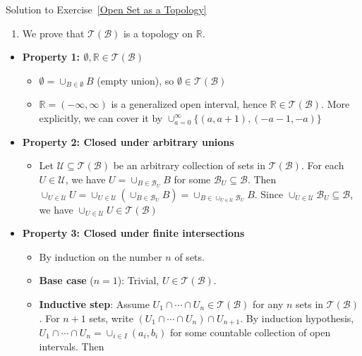 \begin{mystsolution}{Solution to Exercise~\ref{Open Set as a Topology}}\begin{enumerate}
\item We prove that $\mathcal{T}(\mathcal{B})$ is a topology on $\mathbb{R}$.
\end{enumerate}

\begin{itemize}
\item \textbf{Property 1: $\emptyset, \mathbb{R} \in \mathcal{T}(\mathcal{B})$}

\begin{itemize}
\item $\emptyset = \cup_{B \in \emptyset} B$ (empty union), so $\emptyset \in \mathcal{T}(\mathcal{B})$
\item $\mathbb{R} = ( -\infty, \infty)$ is a generalized open interval, hence $\mathbb{R} \in \mathcal{T}(\mathcal{B})$. More explicitly, we can cover it by $\cup_{a=0}^{\infty} \{(a,a+1),( -a -1, -a)\}$
\end{itemize}


\item \textbf{Property 2: Closed under arbitrary unions}

\begin{itemize}
\item Let $\mathcal{U} \subseteq \mathcal{T}(\mathcal{B})$ be an arbitrary collection of sets in $\mathcal{T}(\mathcal{B})$. For each $U \in \mathcal{U}$, we have $U = \cup_{B \in \mathcal{B}_U} B$ for some $\mathcal{B}_U \subseteq \mathcal{B}$. Then $\cup_{U \in \mathcal{U}} U = \cup_{U \in \mathcal{U}} \left(\cup_{B \in \mathcal{B}_U} B\right) = \cup_{B \in \cup_{U \in \mathcal{U}} \mathcal{B}_U} B$. Since $\cup_{U \in \mathcal{U}} \mathcal{B}_U \subseteq \mathcal{B}$, we have $\cup_{U \in \mathcal{U}} U \in \mathcal{T}(\mathcal{B})$
\end{itemize}


\item \textbf{Property 3: Closed under finite intersections}

\begin{itemize}
\item By induction on the number $n$ of sets.
\item \textbf{Base case} ($n=1$): Trivial, $U \in \mathcal{T}(\mathcal{B})$.
\item \textbf{Inductive step}: Assume $U_1 \cap \cdots \cap U_n \in \mathcal{T}(\mathcal{B})$ for any $n$ sets in $\mathcal{T}(\mathcal{B})$.
For $n+1$ sets, write $(U_1 \cap \cdots \cap U_n) \cap U_{n+1}$. By induction hypothesis, $U_1 \cap \cdots \cap U_n = \cup_{i \in I}(a_i, b_i)$
for some countable collection of open intervals. Then


\end{itemize}
\end{itemize}
\end{mystsolution}
